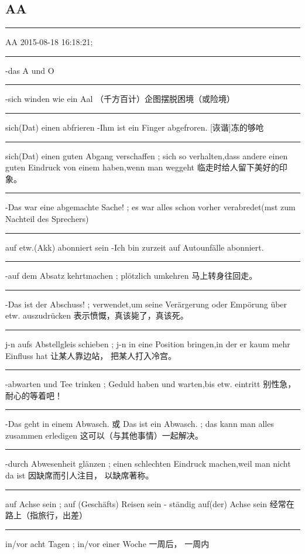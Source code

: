 \subsection{AA}
\label{app:dict:AA}
\noindent

\noindent\rule{\textwidth}{1pt} 
AA 2015-08-18 16:18:21;


\noindent\rule{\textwidth}{1pt}  
-das A und O

\noindent\rule{\textwidth}{1pt}  
-sich winden wie ein Aal
（千方百计）企图摆脱困境（或险境）

\noindent\rule{\textwidth}{1pt}  
sich(Dat) einen abfrieren
-Ihm ist ein Finger abgefroren.
[诙谐]冻的够呛

\noindent\rule{\textwidth}{1pt}  
sich(Dat) einen guten Abgang verschaffen ; sich so verhalten,dass andere einen guten Eindruck von einem haben,wenn man weggeht
临走时给人留下美好的印象。

\noindent\rule{\textwidth}{1pt}  
-Das war eine abgemachte Sache! ; es war alles schon vorher verabredet(mst zum Nachteil des Sprechers)

\noindent\rule{\textwidth}{1pt}  
auf etw.(Akk) abonniert sein
-Ich bin zurzeit auf Autounfälle abonniert.

\noindent\rule{\textwidth}{1pt}  
-auf dem Absatz kehrtmachen ; plötzlich umkehren
马上转身往回走。

\noindent\rule{\textwidth}{1pt}  
-Das ist der Abschuss! ; verwendet,um seine Verärgerung oder Empörung über etw. auszudrücken
表示愤慨，真该毙了，真该死。

\noindent\rule{\textwidth}{1pt}  
j-n aufs Abstellgleis schieben ; j-n in eine Position bringen,in der er kaum mehr Einfluss hat
让某人靠边站， 把某人打入冷宫。

\noindent\rule{\textwidth}{1pt}  
-abwarten und Tee trinken ; Geduld haben und warten,bis etw. eintritt
别性急，耐心的等着吧！

\noindent\rule{\textwidth}{1pt}  
-Das geht in einem Abwasch. 或 Das ist ein Abwasch. ; das kann man alles zusammen erledigen
这可以（与其他事情）一起解决。

\noindent\rule{\textwidth}{1pt}  
-durch Abwesenheit glänzen ; einen schlechten Eindruck machen,weil man nicht da ist
因缺席而引人注目， 以缺席著称。

\noindent\rule{\textwidth}{1pt}  
auf Achse sein ; auf (Geschäfts) Reisen sein
- ständig auf(der) Achse sein  经常在路上（指旅行，出差）

\noindent\rule{\textwidth}{1pt}  
in/vor acht Tagen ; in/vor einer Woche
一周后， 一周内

